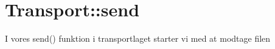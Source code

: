 \graphicspath{{Chapters/Mikrofonmontering/}}

\chapter{Transport::send}

I vores send() funktion i transportlaget starter vi med at modtage filen 